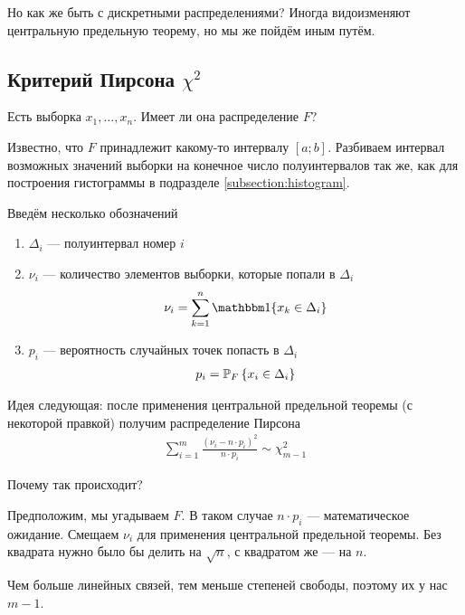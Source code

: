 Но как же быть с дискретными распределениями? Иногда видоизменяют центральную
предельную теорему, но мы же пойдём иным путём.

\subsection{Критерий Пирсона $\chi^2$}

Есть выборка $x_1, \dots, x_n$. Имеет ли она распределение $F$?

Известно, что $F$ принадлежит какому-то интервалу $\left[ a; b \right]$.
Разбиваем интервал возможных значений выборки на конечное число полуинтервалов
так же, как для построения гистограммы в подразделе \ref{subsection:histogram}.

Введём несколько обозначений
\begin{enumerate}
    \item $\Delta_i$ --- полуинтервал номер $i$
    \item $\nu_i$ --- количество элементов выборки, которые попали в $\Delta_i$
        \begin{align*}
            \nu_i = \sum_{k=1}^{n} \Indicator{x_k \in \Delta_i}
        \end{align*}
    \item $p_i$ --- вероятность случайных точек попасть в $\Delta_i$
        \begin{align*}
            p_i = \Probability[F]{x_i \in \Delta_i}
        \end{align*}
\end{enumerate}

Идея следующая: после применения центральной предельной теоремы (с некоторой
правкой) получим распределение Пирсона
\begin{align*}
    \sum_{i=1}^{m}\frac{\left( \nu_i - n \cdot p_i \right)^2}{n \cdot p_i}
    \sim \chi_{m-1}^2
\end{align*}

Почему так происходит?

Предположим, мы угадываем $F$. В таком случае $n \cdot p_i$ --- математическое
ожидание. Смещаем $\nu_i$ для применения центральной предельной теоремы.
Без квадрата нужно было бы делить на $\sqrt{n}$, с квадратом же --- на $n$.

Чем больше линейных связей, тем меньше степеней свободы, поэтому их у нас $m-1$.

